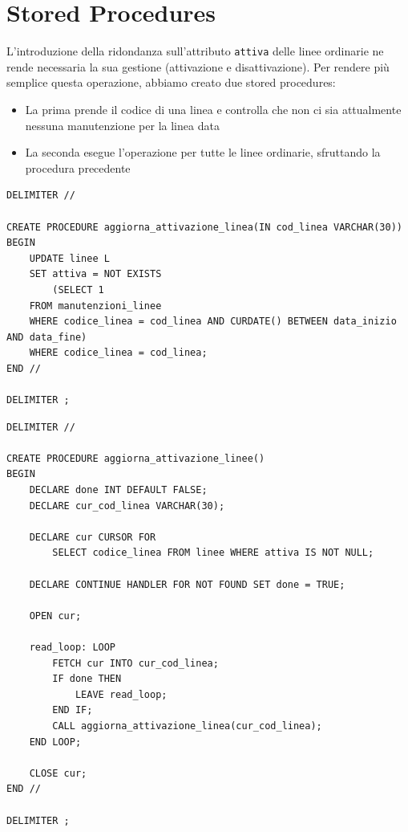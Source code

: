 \documentclass[12pt,a4paper]{report}
\begin{document}
\section{Stored Procedures}
L'introduzione della ridondanza sull'attributo \texttt{attiva} delle linee ordinarie ne rende necessaria la sua gestione (attivazione e disattivazione). Per rendere più semplice questa operazione, abbiamo creato due stored procedures:
\begin{itemize}
	\item La prima prende il codice di una linea e controlla che non ci sia attualmente nessuna manutenzione per la linea data
	\item La seconda esegue l'operazione per tutte le linee ordinarie, sfruttando la procedura precedente
\end{itemize}

\begin{lstlisting}[style=sqlstyle]
DELIMITER //

CREATE PROCEDURE aggiorna_attivazione_linea(IN cod_linea VARCHAR(30))
BEGIN
    UPDATE linee L
    SET attiva = NOT EXISTS
        (SELECT 1
	FROM manutenzioni_linee
	WHERE codice_linea = cod_linea AND CURDATE() BETWEEN data_inizio AND data_fine)
    WHERE codice_linea = cod_linea;
END //

DELIMITER ;
\end{lstlisting}

\begin{lstlisting}[style=sqlstyle]
DELIMITER //

CREATE PROCEDURE aggiorna_attivazione_linee()
BEGIN
    DECLARE done INT DEFAULT FALSE;
    DECLARE cur_cod_linea VARCHAR(30);

    DECLARE cur CURSOR FOR
        SELECT codice_linea FROM linee WHERE attiva IS NOT NULL;

    DECLARE CONTINUE HANDLER FOR NOT FOUND SET done = TRUE;

    OPEN cur;

    read_loop: LOOP
        FETCH cur INTO cur_cod_linea;
        IF done THEN
            LEAVE read_loop;
        END IF;
        CALL aggiorna_attivazione_linea(cur_cod_linea);
    END LOOP;

    CLOSE cur;
END //

DELIMITER ;
\end{lstlisting}
\end{document}
